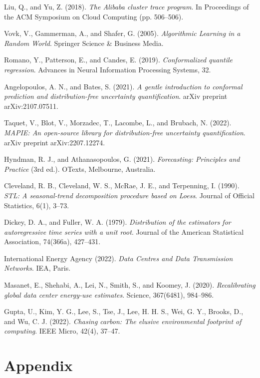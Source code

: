 \documentclass[12pt]{report}
\begin{document}
\begin{enumerate}
Liu, Q., and Yu, Z. (2018). \emph{The Alibaba cluster trace program}. In Proceedings of the ACM Symposium on Cloud Computing (pp. 506--506).

Vovk, V., Gammerman, A., and Shafer, G. (2005). \emph{Algorithmic Learning in a Random World}. Springer Science \& Business Media.

Romano, Y., Patterson, E., and Candes, E. (2019). \emph{Conformalized quantile regression}. Advances in Neural Information Processing Systems, 32.

Angelopoulos, A. N., and Bates, S. (2021). \emph{A gentle introduction to conformal prediction and distribution-free uncertainty quantification}. arXiv preprint arXiv:2107.07511.

Taquet, V., Blot, V., Morzadec, T., Lacombe, L., and Brubach, N. (2022). \emph{MAPIE: An open-source library for distribution-free uncertainty quantification}. arXiv preprint arXiv:2207.12274.

Hyndman, R. J., and Athanasopoulos, G. (2021). \emph{Forecasting: Principles and Practice} (3rd ed.). OTexts, Melbourne, Australia.

Cleveland, R. B., Cleveland, W. S., McRae, J. E., and Terpenning, I. (1990). \emph{STL: A seasonal-trend decomposition procedure based on Loess}. Journal of Official Statistics, 6(1), 3--73.

Dickey, D. A., and Fuller, W. A. (1979). \emph{Distribution of the estimators for autoregressive time series with a unit root}. Journal of the American Statistical Association, 74(366a), 427--431.

International Energy Agency (2022). \emph{Data Centres and Data Transmission Networks}. IEA, Paris.

Masanet, E., Shehabi, A., Lei, N., Smith, S., and Koomey, J. (2020). \emph{Recalibrating global data center energy-use estimates}. Science, 367(6481), 984--986.

Gupta, U., Kim, Y. G., Lee, S., Tse, J., Lee, H. H. S., Wei, G. Y., Brooks, D., and Wu, C. J. (2022). \emph{Chasing carbon: The elusive environmental footprint of computing}. IEEE Micro, 42(4), 37--47.

\end{enumerate}
 

\chapter*{Appendix\hfill} 
\end{document}
